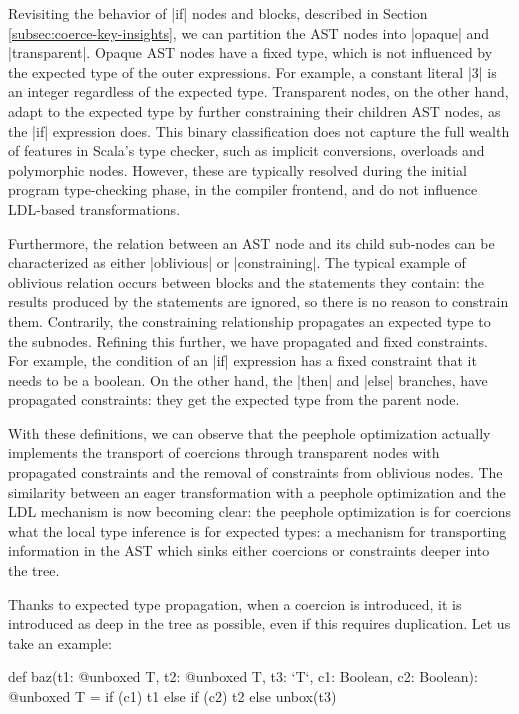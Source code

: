 Revisiting the behavior of |if| nodes and blocks, described in Section \ref{subsec:coerce-key-insights}, we can partition the AST nodes into |opaque| and |transparent|. Opaque AST nodes have a fixed type, which is not influenced by the expected type of the outer expressions. For example, a constant literal |3| is an integer regardless of the expected type. Transparent nodes, on the other hand, adapt to the expected type by further constraining their children AST nodes, as the |if| expression does. This binary classification does not capture the full wealth of features in Scala's type checker, such as implicit conversions, overloads and polymorphic nodes. However, these are typically resolved during the initial program type-checking phase, in the compiler frontend, and do not influence LDL-based transformations.

Furthermore, the relation between an AST node and its child sub-nodes can be characterized as either |oblivious| or |constraining|. The typical example of oblivious relation occurs between blocks and the statements they contain: the results produced by the statements are ignored, so there is no reason to constrain them. Contrarily, the constraining relationship propagates an expected type to the subnodes. Refining this further, we have propagated and fixed constraints. For example, the condition of an |if| expression has a fixed constraint that it needs to be a boolean. On the other hand, the |then| and |else| branches, have propagated constraints: they get the expected type from the parent node.

With these definitions, we can observe that the peephole optimization actually implements the transport of coercions through transparent nodes with propagated constraints and the removal of constraints from oblivious nodes. The similarity between an eager transformation with a peephole optimization and the LDL mechanism is now becoming clear: the peephole optimization is for coercions what the local type inference is for expected types: a mechanism for transporting information in the AST which sinks either coercions or constraints deeper into the tree.

Thanks to expected type propagation, when a coercion is introduced, it is introduced as deep in the tree as possible, even if this requires duplication. Let us take an example:

\begin{lstlisting-nobreak}
 def baz(t1: @unboxed T, t2: @unboxed T, t3: `T`, c1: Boolean, c2: Boolean): @unboxed T =
   if (c1)
     t1
   else
     if (c2)
       t2
     else
       unbox(t3)
\end{lstlisting-nobreak}


